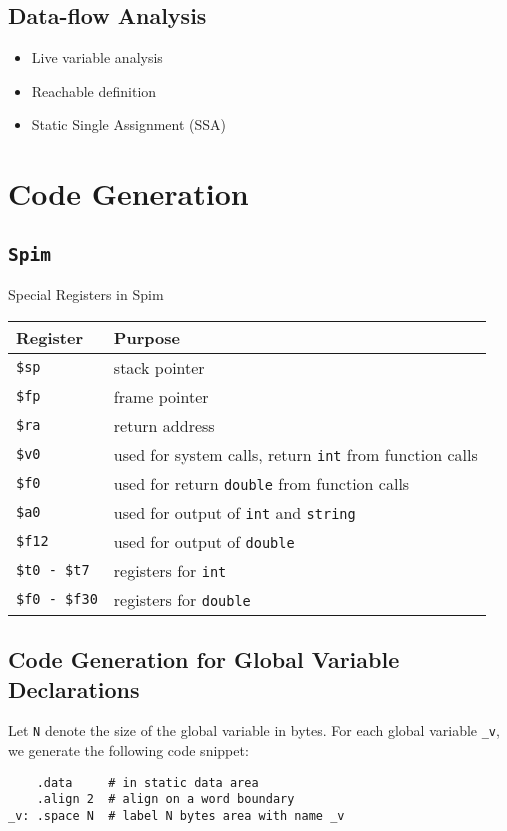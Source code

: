 \documentclass[11pt]{article}
\begin{document}
\subsection{Data-flow Analysis}
\label{sec:orgd9da015}
\begin{itemize}
\item Live variable analysis
\item Reachable definition
\item Static Single Assignment (SSA)
\end{itemize}
\section{Code Generation}
\label{sec:org341d5da}
\subsection{\texttt{Spim}}
\label{sec:orge1b140a}
Special Registers in Spim
\begin{center}
\begin{tabular}{ll}
Register & Purpose\\
\hline
\texttt{\$sp} & stack pointer\\
\texttt{\$fp} & frame pointer\\
\texttt{\$ra} & return address\\
\texttt{\$v0} & used for system calls, return \texttt{int} from function calls\\
\texttt{\$f0} & used for return \texttt{double} from function calls\\
\texttt{\$a0} & used for output of \texttt{int} and \texttt{string}\\
\texttt{\$f12} & used for output of \texttt{double}\\
\texttt{\$t0 - \$t7} & registers for \texttt{int}\\
\texttt{\$f0 - \$f30} & registers for \texttt{double}\\
\end{tabular}
\end{center}
\subsection{Code Generation for Global Variable Declarations}
\label{sec:org2fa2e18}
Let \texttt{N} denote the size of the global variable in bytes. For each global variable \texttt{\_v}, we
generate the following code snippet:
\begin{verbatim}
    .data     # in static data area
    .align 2  # align on a word boundary
_v: .space N  # label N bytes area with name _v
\end{verbatim}
\end{document}
